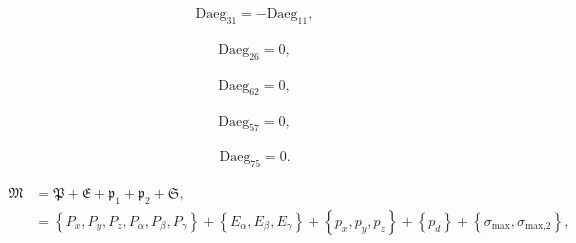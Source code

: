 \documentclass[a4paper,11pt,twoside,openright]{book}
\def\lthtmlcheckvsize{\ifdim\ht\sizebox<\vsize 
  \ifdim\wd\sizebox<\hsize\expandafter\hfill\fi \expandafter\vfill
  \else\expandafter\vss\fi}%
\begin{document}
{\newpage\clearpage
\setcounter{equation}{63}
%
\begin{subequations}\begin{flalign}
&\textrm{Daeg}_{31} = -\textrm{Daeg}_{11} , &
\end{flalign}\end{subequations}%
\lthtmldisplayZ
\lthtmlcheckvsize\clearpage}

{\newpage\clearpage
\setcounter{equation}{63}
%
\begin{subequations}\begin{flalign}
&\textrm{Daeg}_{26} = 0 , &
\end{flalign}\end{subequations}%
\lthtmldisplayZ
\lthtmlcheckvsize\clearpage}

{\newpage\clearpage
\setcounter{equation}{63}
%
\begin{subequations}\begin{flalign}
&\textrm{Daeg}_{62} = 0 , &
\end{flalign}\end{subequations}%
\lthtmldisplayZ
\lthtmlcheckvsize\clearpage}

{\newpage\clearpage
\setcounter{equation}{63}
%
\begin{subequations}\begin{flalign}
&\textrm{Daeg}_{57} = 0 , &
\end{flalign}\end{subequations}%
\lthtmldisplayZ
\lthtmlcheckvsize\clearpage}

{\newpage\clearpage
\setcounter{equation}{63}
%
\begin{subequations}\begin{flalign}
&\textrm{Daeg}_{75} = 0 . &
\end{flalign}\end{subequations}%
\lthtmldisplayZ
\lthtmlcheckvsize\clearpage}

{\newpage\clearpage
\setcounter{equation}{64}
%
\begin{subequations}\begin{align}
\mathfrak{M}&= \mathfrak{P}+ \mathfrak{E}+ \mathfrak{p}_1+ \mathfrak{p}_2+ \mathfrak{S}, \\
&= \left\{ P_x, P_y, P_z, P_\alpha , P_\beta , P_\gamma \right\} + \left\{ E_\alpha , E_\beta , E_\gamma \right\} + \left\{ p_x, p_y, p_z\right\} + \left\{ p_d\right\} + \left\{ \sigma_{\textrm{max}}, \sigma_{\textrm{max,2}}\right\},
\end{align}\end{subequations}%
\lthtmldisplayZ
\lthtmlcheckvsize\clearpage}
\end{document}

